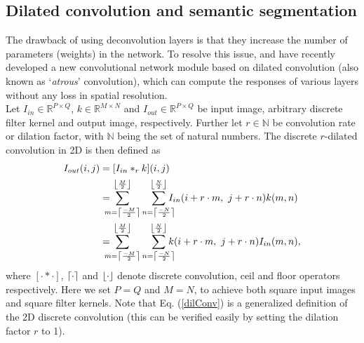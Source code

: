 \documentclass[a4paper]{mva_style}
\DeclarePairedDelimiter\ceil{\lceil}{\rceil}
\DeclarePairedDelimiter\floor{\lfloor}{\rfloor}
\begin{document}
\subsection{Dilated convolution and semantic segmentation}
The drawback of using deconvolution layers is that they increase the number of parameters (weights) in the network. To resolve this issue, \cite{Yu2016multi} and \cite{chen2016deeplab} have recently developed a new convolutional network module based on dilated convolution (also known as `\textit{atrous}' convolution), which can compute the responses of various layers without any loss in spatial resolution.\\
\indent Let $I_{in} \in \mathbb{R}^{P\times Q}$, $k \in \mathbb{R}^{M\times N}$ and $I_{out} \in \mathbb{R}^{P\times Q}$ be input image, arbitrary discrete filter kernel and output image, respectively. Further let $r \in \mathbb{N}$ be convolution rate or dilation factor, with $\mathbb{N}$ being the set of natural numbers. The discrete  $r$-dilated convolution in 2D is then defined as \cite{chen2016deeplab}
\begin{equation} \label{dilConv}
\begin{split}
I_{out}(i, j) & = [I_{in}\ast_r k] (i,j)\\
& =\hspace{-0.3cm} \sum_{m =  \ceil*{\frac{-M}{2}}}^{\floor*{\frac{M}{2}}}\sum_{n =  \ceil*{\frac{-N}{2}}}^{\floor*{\frac{N}{2}}}\hspace{-0.3cm}I_{in}(i + r\cdot m,\ j+r\cdot n)k(m,n)\\
& =\hspace{-0.3cm} \sum_{m =  \ceil*{\frac{-M}{2}}}^{\floor*{\frac{M}{2}}}\sum_{n =  \ceil*{\frac{-N}{2}}}^{\floor*{\frac{N}{2}}}\hspace{-0.3cm}k(i + r\cdot m,\ j+r\cdot n)I_{in}(m,n),\\
\end{split}
\end{equation}
where $[\cdot\ast \cdot]$, $\ceil{\cdot}$ and $\floor{\cdot}$ denote discrete convolution, ceil and floor operators respectively. Here we set $P = Q$ and $M=N$, to achieve both square input images and square filter kernels. Note that Eq. (\ref{dilConv}) is a generalized definition of the 2D discrete convolution (this can be verified easily by setting the dilation factor $r$ to 1). 
\end{document}
